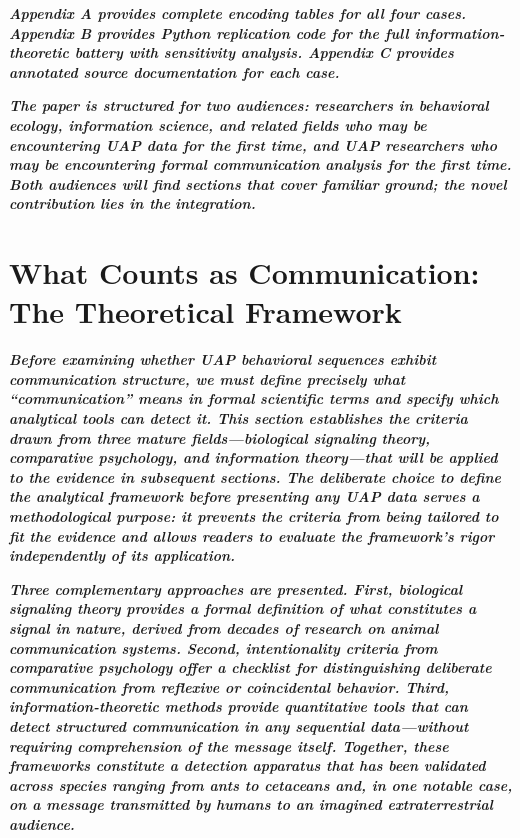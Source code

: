 \documentclass[11pt,letterpaper]{article}
\begin{document}
\textbf{\textit{Appendix A provides complete encoding tables for all four cases. Appendix B provides Python replication code for the full information-theoretic battery with sensitivity analysis. Appendix C provides annotated source documentation for each case.}}


\textbf{\textit{The paper is structured for two audiences: researchers in behavioral ecology, information science, and related fields who may be encountering UAP data for the first time, and UAP researchers who may be encountering formal communication analysis for the first time. Both audiences will find sections that cover familiar ground; the novel contribution lies in the }}\textbf{\textit{integration}}\textbf{\textit{.}}


\section{What Counts as Communication: The Theoretical Framework}

\textbf{\textit{Before examining whether UAP behavioral sequences exhibit communication structure, we must define precisely what ``communication'' means in formal scientific terms and specify which analytical tools can detect it. This section establishes the criteria drawn from three mature fields---biological signaling theory, comparative psychology, and information theory---that will be applied to the evidence in subsequent sections. The deliberate choice to define the analytical framework before presenting any UAP data serves a methodological purpose: it prevents the criteria from being tailored to fit the evidence and allows readers to evaluate the framework's rigor independently of its application.}}


\textbf{\textit{Three complementary approaches are presented. First, biological signaling theory provides a formal definition of what constitutes a signal in nature, derived from decades of research on animal communication systems. Second, intentionality criteria from comparative psychology offer a checklist for distinguishing deliberate communication from reflexive or coincidental behavior. Third, information-theoretic methods provide quantitative tools that can detect structured communication in any sequential data---without requiring comprehension of the message itself. Together, these frameworks constitute a detection apparatus that has been validated across species ranging from ants to cetaceans and, in one notable case, on a message transmitted by humans to an imagined extraterrestrial audience.}}
\end{document}
